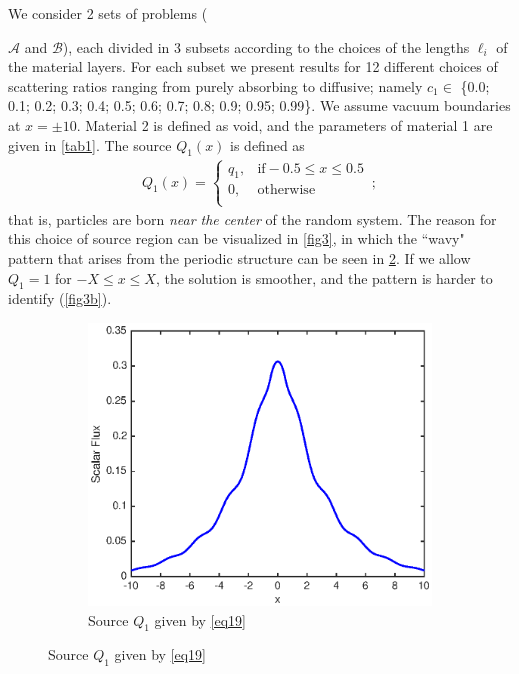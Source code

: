 \documentclass[12pt]{article}
\newcommand{\seta}{\mathcal{A}}
\newcommand{\setb}{\mathcal{B}}
\begin{document}
We consider 2 sets of problems ({$\seta$ and $\setb$), each divided in 3 subsets according to the choices of the lengths $\ell_i$ of the material layers.
For each subset we present results for 12 different choices of scattering ratios ranging from purely absorbing to diffusive; namely $c_1 \in$ \{0.0; 0.1; 0.2; 0.3; 0.4; 0.5; 0.6; 0.7; 0.8; 0.9; 0.95; 0.99\}.
We assume vacuum boundaries at $x = \pm 10$.
Material 2 is defined as void, and the parameters of material 1 are given in \cref{tab1}.
The source $Q_1(x)$ is defined as 
\begin{align}\label{eq19}
Q_1(x) = \left\{
\begin{array}{cl}
q_1, & \text{if} -0.5\leq x\leq 0.5\\
0, &\text{otherwise}\\
\end{array}
\right .\, ; 
\end{align}
that is, particles are born {\em near the center} of the random system.
The reason for this choice of source region can be visualized in \cref{fig3}, in which the ``wavy" pattern that arises from the periodic structure can be seen in \cref{fig3a}.
If we allow $Q_1=1$ for $-X\leq x\leq X$, the solution is smoother, and the pattern is harder to identify (\cref{fig3b}).    
\begin{figure}[hbt]
    \centering
    \begin{subfigure}{0.495\textwidth}
        \centering
        \includegraphics[width=\textwidth]{fig3a.eps}
        \caption{Source $Q_1$ given by \cref{eq19}}
        \label{fig3a}

\end{subfigure}
\end{figure}}
\end{document}
